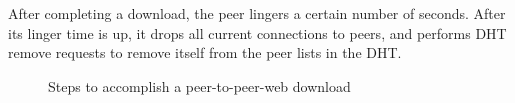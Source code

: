 After completing a download, the peer lingers a certain number of seconds.  After its linger time is up, it drops all current connections to peers, and performs DHT remove requests to
remove itself from the peer lists in the DHT.

\begin{figure}
  \begin{center}
    \caption{Steps to accomplish a peer-to-peer-web download}
    \label{fig:download_all_steps}
  \end{center}
\end{figure}

